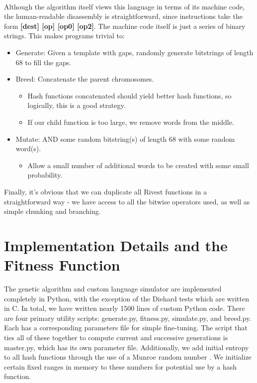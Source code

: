 \documentclass{article}
\begin{document}
\paragraph{}
Although the algorithm itself views this language in terms of its machine code, the human-readable disassembly is straightforward, since instructions take the form \textbf{[dest] [op] [op0] [op2]}. The machine code itself is just a series of binary strings. This makes programs trivial to:
	\begin{itemize}
	\item Generate: Given a template with gaps, randomly generate bitstrings of length 68 to fill the gaps.
	\item Breed: Concatenate the parent chromosomes.
		\begin{itemize}
			\item Hash functions concatenated should yield better hash functions, so logically, this is a good strategy.
			\item If our child function is too large, we remove words from the middle.
		\end{itemize}
	\item Mutate: AND some random bitstring(s) of length 68 with some random word(s).
		\begin{itemize}
		\item Allow a small number of additional words to be created with some small probability.
		\end{itemize}
	\end{itemize}

Finally, it's obvious that we can duplicate all Rivest functions in a straightforward way - we have access to all the bitwise operators used, as well as simple chunking and branching.

\section{Implementation Details and the Fitness Function}
The genetic algorithm and custom language simulator are implemented completely in Python, with the exception of the Diehard tests \cite{Diehard} which are written in C.
In total, we have written nearly 1500 lines of custom Python code.
 There are four primary utility scripts: generate.py, fitness.py, simulate.py, and breed.py. Each has a corresponding parameters file for simple fine-tuning. The script that ties all of these together to compute current and successive generations is master.py, which has its own parameter file. Additionally, we add initial entropy to all hash functions through the use of a Munroe random number \cite{Munroe}. We initialize certain fixed ranges in memory to these numbers for potential use by a hash function. 
\end{document}
